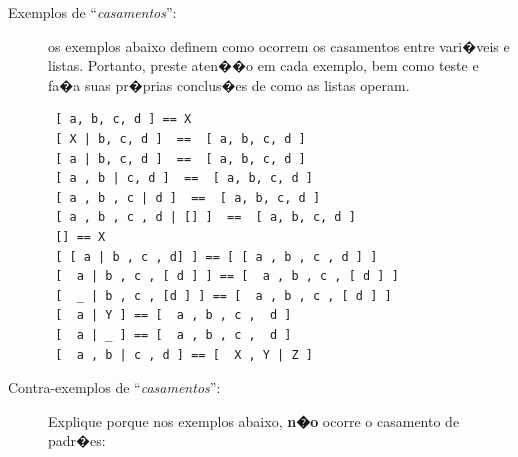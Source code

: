 \documentclass[final,a4paper]{article}
\begin{document}
\begin{description}
\newpage
\item [Exemplos de ``{\em casamentos}'':] os exemplos abaixo definem
como ocorrem os casamentos entre vari�veis e listas.
Portanto, preste aten��o em cada exemplo, bem como teste e
fa�a suas pr�prias conclus�es de como as listas operam.

\begin{lstlisting}
 [ a, b, c, d ] == X
 [ X | b, c, d ]  ==  [ a, b, c, d ]
 [ a | b, c, d ]  ==  [ a, b, c, d ]
 [ a , b | c, d ]  ==  [ a, b, c, d ]
 [ a , b , c | d ]  ==  [ a, b, c, d ]
 [ a , b , c , d | [] ]  ==  [ a, b, c, d ]
 [] == X
 [ [ a | b , c , d] ] == [ [ a , b , c , d ] ]
 [  a | b , c , [ d ] ] == [  a , b , c , [ d ] ]
 [  _ | b , c , [d ] ] == [  a , b , c , [ d ] ]
 [  a | Y ] == [  a , b , c ,  d ]
 [  a | _ ] == [  a , b , c ,  d ]
 [  a , b | c , d ] == [  X , Y | Z ]
\end{lstlisting}

\newpage

\item [Contra-exemplos de ``{\em casamentos}'':] Explique porque nos
 exemplos abaixo, {\bf n�o} ocorre o casamento de padr�es:


\end{description}
\end{document}
